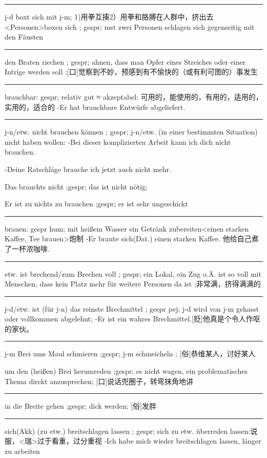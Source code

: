 \noindent\rule{\textwidth}{1pt} 
j-d boxt sich mit j-m; 1)用拳互揍2）用拳和胳膊在人群中，挤出去
\textless Personen\textgreater  boxen sich ; gespr; mst zwei Personen schlagen sich gegenseitig mit den Fäusten

\noindent\rule{\textwidth}{1pt} 
den Braten riechen ; gespr; ahnen, dass man Opfer eines Streiches oder einer Intrige werden soll ;[口]觉察到不妙，预感到有不愉快的（或有利可图的）事发生

\noindent\rule{\textwidth}{1pt} 
brauchbar: gespr; relativ gut ≈ akzeptabel: 可用的，能使用的，有用的，适用的，实用的，适合的
-Er hat brauchbare Entwürfe abgeliefert.

\noindent\rule{\textwidth}{1pt} 
j-n/etw. nicht brauchen können ; gespr; j-n/etw. (in einer bestimmten Situation) nicht haben wollen: 
-Bei dieser komplizierten Arbeit kann ich dich nicht brauchen.

-Deine Ratschläge brauche ich jetzt auch nicht mehr.

Das brauchts nicht ;gespr; das ist nicht nötig;

Er ist zu nichts zu brauchen ;gespr; er ist sehr ungeschickt

\noindent\rule{\textwidth}{1pt} 
brauen: gespr hum; mit heißem Wasser ein Getränk zubereiten\textless einen starken Kaffee, Tee brauen\textgreater  炮制
-Er braute sich(Dat.) einen starken Kaffee. 他给自己煮了一杯浓咖啡.

\noindent\rule{\textwidth}{1pt} 
etw. ist brechend/zum Brechen voll ; gespr; ein Lokal, ein Zug o.Ä. ist so voll mit Menschen, dass kein Platz mehr für weitere Personen da ist ;非常满，挤得满满的

\noindent\rule{\textwidth}{1pt} 
j-d/etw. ist (für j-n) das reinste Brechmittel ; gespr pej; j-d wird von j-m gehasst oder vollkommen abgelehnt;
-Er ist ein wahres Brechmittel.[贬]他真是个令人作呕的家伙。

\noindent\rule{\textwidth}{1pt} 
j-m Brei ums Maul schmieren ;gespr; j-m schmeicheln ; [俗]恭维某人，讨好某人

um den (heißen) Brei herumreden ;gespr; es nicht wagen, ein problematisches Thema direkt anzusprechen; [口]说话兜圈子，转弯抹角地讲

\noindent\rule{\textwidth}{1pt} 
in die Breite gehen ;gespr; dick werden; [俗]发胖

\noindent\rule{\textwidth}{1pt} 
sich(Akk) (zu etw.) breitschlagen lassen ; gespr; sich zu etw. überreden lassen:说服，\textless 瑞\textgreater 过于看重，过分重视
-Ich habe mich wieder breitschlagen lassen, länger zu arbeiten

